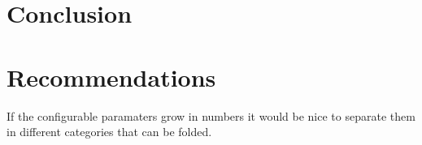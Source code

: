 \chapter{Conclusion}
\chapter{Recommendations}
If the configurable paramaters grow in numbers it would be nice to separate them in different categories that can be folded.